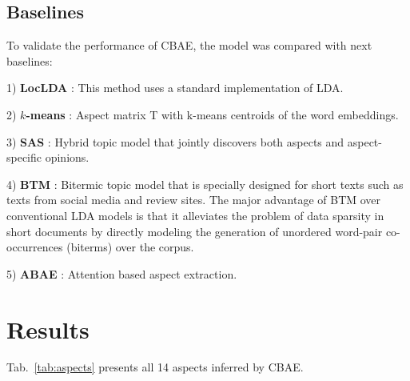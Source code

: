 \documentclass{article}
\begin{document}
\subsection{Baselines}
To validate the performance of CBAE, the model was compared with next baselines:

1) \textbf{LocLDA} \cite{Brody2010UAS}: This method uses a standard implementation of LDA.

2) \textbf{$k$-means} \cite{He2018ABAE}: Aspect matrix T with k-means centroids of the word embeddings.

3) \textbf{SAS} \cite{Mukherjee2012}: Hybrid topic model that jointly discovers both aspects and aspect-specific opinions.

4) \textbf{BTM} \cite{Yan2013}: Bitermic topic model that is specially designed for short texts such as texts from social media and review sites. The major advantage of BTM over conventional LDA models is that it alleviates the problem of data sparsity in short documents by directly modeling the generation of unordered word-pair co-occurrences (biterms) over the corpus.

5) \textbf{ABAE} \cite{He2018ABAE}: Attention based aspect extraction.


\section{Results}
Tab.~\ref{tab:aspects} presents all 14 aspects inferred by CBAE.
\end{document}
